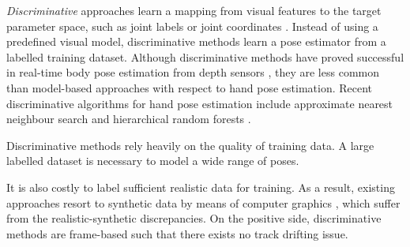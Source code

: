 \emph{Discriminative} approaches learn a mapping from visual features to the target parameter space, such as joint labels \cite{Shotton2011} or joint coordinates \cite{Girshick2011}.  
Instead of using a predefined visual model, discriminative methods learn a pose estimator from a labelled training dataset. 
Although discriminative methods have proved successful in real-time body pose estimation from depth sensors \cite{Shotton2011, Girshick2011, Baak2011, Sun2012}, they are less common than model-based approaches with respect to hand pose estimation. 
Recent discriminative algorithms for hand pose estimation include approximate nearest neighbour search \cite{Romero2009, Wang2009} and hierarchical random forests \cite{Keskin2012}. 

Discriminative methods rely heavily on the quality of training data. A large labelled dataset is necessary to model a wide range of poses. 

It is also costly to label sufficient realistic data for training. As a result, existing approaches resort to synthetic data by means of computer graphics \cite{Romero2009, Keskin2012}, which suffer from the realistic-synthetic discrepancies.
On the positive side, discriminative methods are frame-based such that there exists no track drifting issue. 

